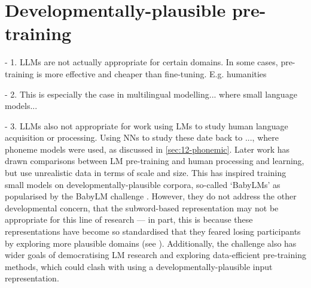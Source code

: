 \section{Developmentally-plausible pre-training}\label{sec:12-plausiblepretraining}


- 1. LLMs are not actually appropriate for certain domains. In some cases, pre-training is more effective and cheaper than fine-tuning. E.g. humanities

- 2. This is especially the case in multilingual modelling... where small language models...

- 3. LLMs also not appropriate for work using LMs to study human language acquisition or processing. Using NNs to study these date back to ..., where phoneme models were used, as discussed in \cref{sec:12-phonemic}. Later work has drawn comparisons between LM pre-training and human processing and learning, but use unrealistic data in terms of scale and size. This has inspired training small models on developmentally-plausible corpora, so-called `BabyLMs' as popularised by the BabyLM challenge \addcites. However, they do not address the other developmental concern, that the subword-based representation may not be appropriate for this line of research --- in part, this is because these representations have become so standardised that they feared losing participants by exploring more plausible domains (see \citet{wilcox2025}). Additionally, the challenge also has wider goals of democratising LM research and exploring data-efficient pre-training methods, which could clash with using a developmentally-plausible input representation.





